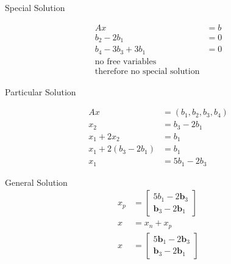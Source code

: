 \documentclass[main.tex]{subfiles}
\begin{document}
\begin{enumerate}
    Special Solution
    
    $$
    \begin{aligned}
    A x &= b\\
    b_{2}-2 b_{1} &= 0 \\
    b_{4}-3 b_{3}+3 b_{1} &= 0\\
    \text{no free variables} &\\
    \text{therefore no special solution} &
    \end{aligned}
    $$
    
    Particular Solution
    
    $$
    \begin{aligned}
    Ax &= \left(b_{1}, b_{2}, b_{3}, b_{4}\right)\\
    x_{2} &= b_{3}-2 b_{1} \\
    x_{1}+2 x_{2} &=b_{1} \\
    x_{1}+2\left(b_{3}-2 b_{1}\right) &=b_{1} \\
    x_{1} &=5 b_{1}-2 b_{3}
    \end{aligned}
    $$
    
    General Solution
    $$
    \begin{aligned}
    x_{p} &= \left[\begin{array}{c}
    5 b_{1}-2\mathbf{b}_{3} \\
    \mathbf{b}_{3}-2\mathbf{b}_{1}
    \end{array}\right]\\
    x &= x_{n}+x_{p} \\
    x &= \left[\begin{array}{c}
    5 \mathbf{b}_{1}-2\mathbf{b}_{3} \\
    \mathbf{b}_{3}-2\mathbf{b}_{1}
    \end{array}\right]
    \end{aligned}
    $$
    

\end{enumerate}
\end{document}
